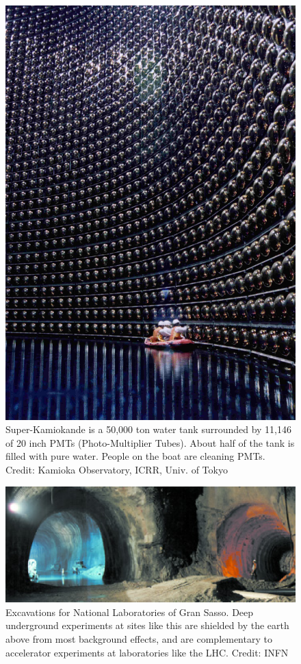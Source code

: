 \documentclass[12pt]{iopart}
\begin{document}
\begin{figure}[htbp]
\centering
 \includegraphics[bb=0 0 360 530, width=5in]{Fig4-neutrino.eps}
 \caption{Super-Kamiokande is a 50,000 ton water tank surrounded by 11,146 of 20 inch PMTs (Photo-Multiplier Tubes). About half of the tank is filled with pure water. People on the boat are cleaning PMTs.  Credit: Kamioka Observatory, ICRR, Univ. of Tokyo \label{Fig4-neutrino.eps}}
 \end{figure}
\begin{figure}[htbp]
\centering
 \includegraphics[bb=0 0 360 150, width=5in]{Fig5-IN0035H.eps}
 \caption{Excavations for National Laboratories of Gran Sasso. Deep underground experiments at sites like this are shielded by the earth above from most background effects, and are complementary to accelerator experiments at laboratories like the LHC. Credit: INFN \label{Fig5-IN0035H.eps}}
 \end{figure}
\end{document}
